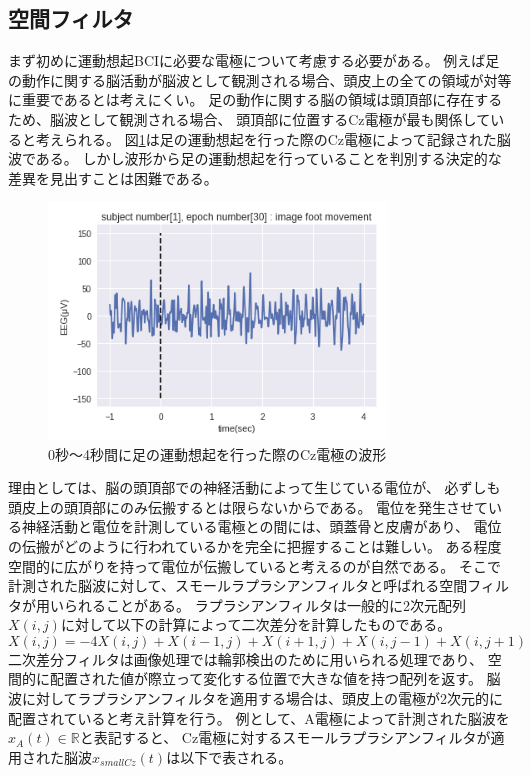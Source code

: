 \subsection{空間フィルタ}
まず初めに運動想起BCIに必要な電極について考慮する必要がある。
例えば足の動作に関する脳活動が脳波として観測される場合、頭皮上の全ての領域が対等に重要であるとは考えにくい。
足の動作に関する脳の領域は頭頂部に存在するため、脳波として観測される場合、
頭頂部に位置するCz電極が最も関係していると考えられる。
図\ref{fig:Cz}は足の運動想起を行った際のCz電極によって記録された脳波である。
しかし波形から足の運動想起を行っていることを判別する決定的な差異を見出すことは困難である。
\begin{figure}[t]
    \centering
    \includegraphics[width=9cm]{images/CzEEG.png}
    \caption{0秒〜4秒間に足の運動想起を行った際のCz電極の波形}
    \label{fig:Cz}
\end{figure}
理由としては、脳の頭頂部での神経活動によって生じている電位が、
必ずしも頭皮上の頭頂部にのみ伝搬するとは限らないからである。
電位を発生させている神経活動と電位を計測している電極との間には、頭蓋骨と皮膚があり、
電位の伝搬がどのように行われているかを完全に把握することは難しい。
ある程度空間的に広がりを持って電位が伝搬していると考えるのが自然である。
そこで計測された脳波に対して、スモールラプラシアンフィルタと呼ばれる空間フィルタが用いられることがある。
ラプラシアンフィルタは一般的に2次元配列\(X(i,j)\)に対して以下の計算によって二次差分を計算したものである。
\begin{equation}
    X(i,j) = -4X(i,j) + X(i-1,j) + X(i+1,j) + X(i,j-1) + X(i,j+1)
\end{equation}
二次差分フィルタは画像処理では輪郭検出のために用いられる処理であり、
空間的に配置された値が際立って変化する位置で大きな値を持つ配列を返す。
脳波に対してラプラシアンフィルタを適用する場合は、頭皮上の電極が2次元的に配置されていると考え計算を行う。
例として、A電極によって計測された脳波を\(x_A(t) \in \mathbb R\)と表記すると、
Cz電極に対するスモールラプラシアンフィルタが適用された脳波\(x_{smallCz}(t)\)は以下で表される。
